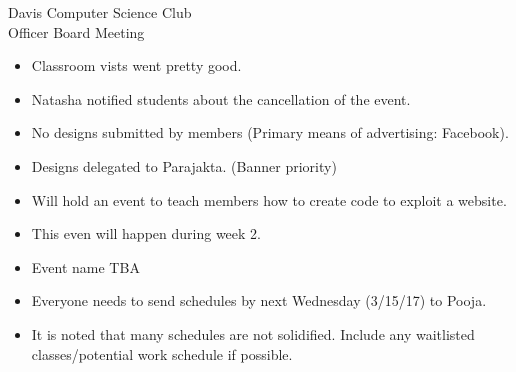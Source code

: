 \documentclass{article}
\begin{document}
\begin{Minutes}{Davis Computer Science Club\\Officer Board Meeting}





\maketitle

\begin{itemize}
    \item Classroom vists went pretty good.
    \item Natasha notified students about the cancellation of the event.
\end{itemize}

\begin{itemize}
    \item No designs submitted by members (Primary means of advertising: Facebook).
    \item Designs delegated to Parajakta. (Banner priority)
\end{itemize}

\begin{itemize}
    \item Will hold an event to teach members how to create code to exploit a website.
    \item This even will happen during week 2.
    \item Event name TBA
\end{itemize}

\begin{itemize}
    \item Everyone needs to send schedules by next Wednesday (3/15/17) to Pooja.
    \item It is noted that many schedules are not solidified. Include any waitlisted classes/potential work schedule if possible.
\end{itemize}



\end{Minutes}
\end{document}
